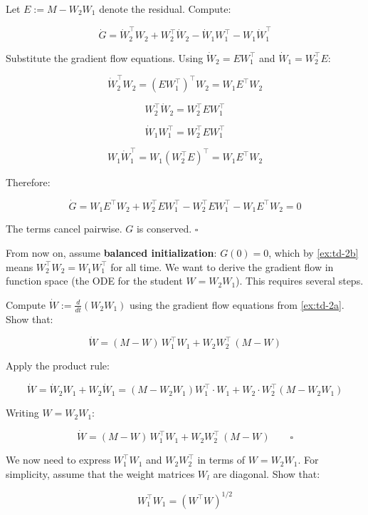 \documentclass[11pt]{article}
\begin{document}
\begin{solution}[ex:td-2b]
Let \(E := M - W_2 W_1\) denote the residual. Compute:

\[\dot{G} = \dot{W}_2^\top W_2 + W_2^\top \dot{W}_2 - \dot{W}_1 W_1^\top - W_1 \dot{W}_1^\top\]

Substitute the gradient flow equations. Using \(\dot{W}_2 = E W_1^\top\)
and \(\dot{W}_1 = W_2^\top E\):

\[\dot{W}_2^\top W_2 = (E W_1^\top)^\top W_2 = W_1 E^\top W_2\]

\[W_2^\top \dot{W}_2 = W_2^\top E W_1^\top\]

\[\dot{W}_1 W_1^\top = W_2^\top E W_1^\top\]

\[W_1 \dot{W}_1^\top = W_1(W_2^\top E)^\top = W_1 E^\top W_2\]

Therefore:

\[\dot{G} = W_1 E^\top W_2 + W_2^\top E W_1^\top - W_2^\top E W_1^\top - W_1 E^\top W_2 = 0\]

The terms cancel pairwise. \(G\) is conserved. \(\square\)
\end{solution}

From now on, assume \textbf{balanced initialization}:
\(G(0) = 0\), which by \cref{ex:td-2b} means \(W_2^\top W_2 = W_1 W_1^\top\)
for all time. We want to derive the gradient flow in function space (the
ODE for the student \(W = W_2 W_1\)). This requires several steps.

\begin{exercise}
\label{ex:td-2ci}
Compute \(\dot{W} := \frac{d}{dt}(W_2 W_1)\) using the
gradient flow equations from \cref{ex:td-2a}. Show that:

\[\dot{W} = (M - W)\, W_1^\top W_1 + W_2 W_2^\top\, (M - W)\]
\end{exercise}

\begin{solution}[ex:td-2ci]
Apply the product rule:

\[\dot{W} = \dot{W}_2 W_1 + W_2 \dot{W}_1 = (M - W_2 W_1)W_1^\top \cdot W_1 + W_2 \cdot W_2^\top(M - W_2 W_1)\]

Writing \(W = W_2 W_1\):

\[\dot{W} = (M - W)\,W_1^\top W_1 + W_2 W_2^\top\,(M - W) \qquad \square\]
\end{solution}

\begin{exercise}
\label{ex:td-2cii}
We now need to express \(W_1^\top W_1\) and
\(W_2 W_2^\top\) in terms of \(W = W_2 W_1\). For simplicity, assume
that the weight matrices \(W_l\) are diagonal. Show that:

\[W_1^\top W_1 = (W^\top W)^{1/2}\]
\end{exercise}
\end{document}
